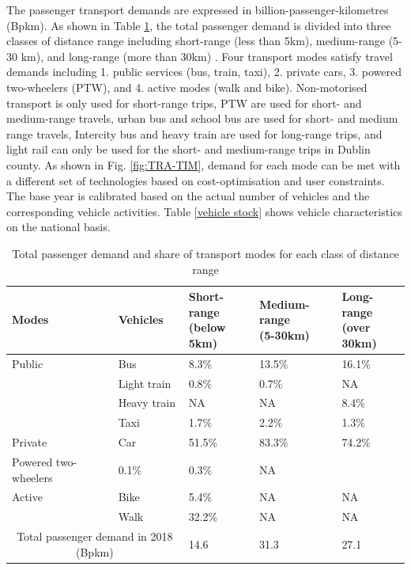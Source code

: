 \documentclass[gmd,manuscript]{copernicus}
\begin{document}
The passenger transport demands are expressed in billion-passenger-kilometres (Bpkm). As shown in Table \ref{passenger transport demand}, the total passenger demand is divided into three classes of distance range including short-range (less than 5km), medium-range (5-30 km), and long-range (more than 30km) \citep{NTA2018}. Four transport modes satisfy travel demands including 1. public services (bus, train, taxi), 2. private cars, 3. powered two-wheelers (PTW), and 4. active modes (walk and bike). Non-motorised transport is only used for short-range trips, PTW are used for short- and medium-range travels, urban bus and school bus are used for short- and medium range travels, Intercity bus and heavy train are used for long-range trips, and light rail can only be used for the short- and medium-range trips in Dublin county. As shown in Fig. \ref{fig:TRA-TIM}, demand for each mode can be met with a different set of technologies based on cost-optimisation and user constraints. The base year is calibrated based on the actual number of vehicles and the corresponding vehicle activities. Table \ref{vehicle stock} shows vehicle characteristics on the national basis. 

\begin{table}[h!]
 \centering
 \footnotesize
 \caption{Total passenger demand and share of transport modes for each class of distance range \citep{CentralStatisticsOffice2017, CSONTS19how, CentralStatisticsOffice2020a, CentralStatisticsOffice2020c, CentralStatisticsOffice2020d, CentralStatisticsOffice2020e}}
 \begin{tabular}{lllll}
 \hline 
 Modes & Vehicles & \makecell{Short-range \\ (below 5km)} & \makecell{Medium-range \\ (5-30km)} & \makecell{Long-range \\ (over 30km)} \\ 
 \hline
 Public & Bus & 8.3\% &	13.5\% &	16.1\% \\
 & Light train &	0.8\% &	0.7\% &	NA \\
 & Heavy train &	NA & NA &	8.4\% \\
 & Taxi &	1.7\% &	2.2\% &	1.3\% \\
 \hline
 Private & Car	& 51.5\% &	83.3\%	& 74.2\% \\
 \hline
 Powered two-wheelers & 0.1\% &	0.3\%	& NA \\
 \hline
 Active & Bike &	5.4\% & 	NA & 	NA \\
 
 & Walk &	32.2\% &	NA &	NA \\
 \hline
 \multicolumn{2}{c}{Total passenger demand in 2018 (Bpkm)} &	14.6 &	31.3 &	27.1 \\ [1ex]
 \hline
 \end{tabular}
 
 \label{passenger transport demand}
\end{table}
\end{document}

